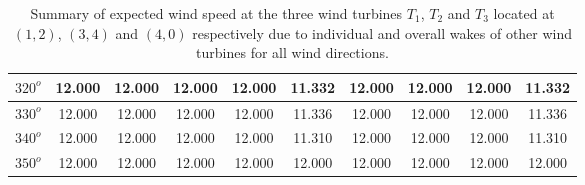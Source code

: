 \begin{table}[H]
\begin{tabular}{|c|c|c|c|c|c|c|c|c|c|}
	         \hline
	         $320^{o}$ & 12.000 & 12.000 & 12.000 & 12.000 & 11.332 & 12.000 & 12.000& 12.000 & 11.332  \\
	         \hline
	         $330^{o}$ & 12.000 & 12.000 & 12.000 & 12.000 & 11.336 & 12.000 & 12.000& 12.000 & 11.336  \\
	         \hline
	         $340^{o}$ & 12.000 & 12.000 & 12.000 & 12.000 & 11.310 & 12.000 & 12.000& 12.000 & 11.310  \\
	         \hline
	         $350^{o}$ & 12.000 & 12.000 & 12.000 & 12.000 & 12.000 & 12.000 & 12.000& 12.000 & 12.000  \\
	         \hline
	         
	    \end{tabular}
	    
	    \caption{Summary of expected wind speed at the three wind turbines $T_1$, $T_2$ and $T_3$ located at $(1,2)$, $(3,4)$ and $(4,0)$ respectively due to individual and overall wakes of other wind turbines for all wind directions.}
	    \label{summaryRandom3-3a}
	\end{table}
	\doublespacing
	

